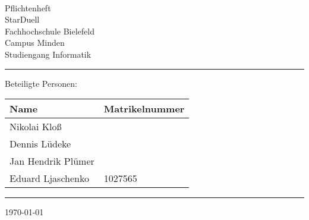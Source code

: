 


\begin{titlepage}
   \mbox{}\vspace{5\baselineskip}\\
   \sffamily\huge
   \centering
   {\Huge Pflichtenheft} \\
   \normalsize StarDuell
   \vspace{3\baselineskip}\\
   \rmfamily\Large
  Fachhochschule Bielefeld \\
  Campus Minden \\
  Studiengang Informatik
   \vspace{1\baselineskip}\\
\noindent\rule{15cm}{0.3pt}
Beteiligte Personen:
\begin{table}[H]
	\tablestyle
	\begin{tabular}{*{2}{v{0.45\textwidth}}}
		\hline
		\textbf{Name} &
		\textbf{Matrikelnummer} \tabularnewline
		\hline
		Nikolai Kloß &   \tabularnewline
		Dennis Lüdeke & \tabularnewline
		Jan Hendrik Plümer & \tabularnewline
		Eduard Ljaschenko & 1027565\tabularnewline
	\end{tabular}
\end{table}
   \noindent\rule{15cm}{0.4pt}

   \today
\end{titlepage}

